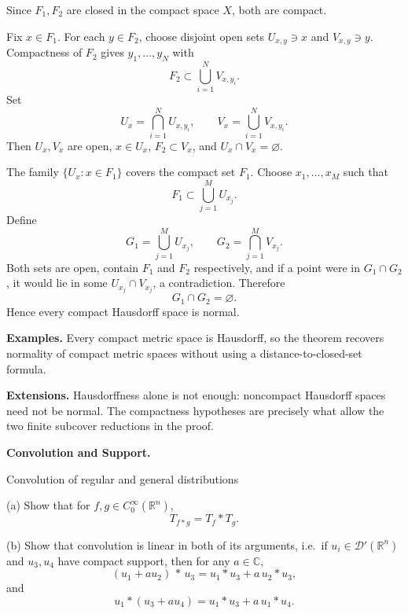 \begin{solution}
Since \(F_1,F_2\) are closed in the compact space \(X\), both are compact.

Fix \(x\in F_1\). For each \(y\in F_2\), choose disjoint open sets
\(U_{x,y}\ni x\) and \(V_{x,y}\ni y\). Compactness of \(F_2\) gives
\(y_1,\dots,y_N\) with
\[
F_2\subset\bigcup_{i=1}^N V_{x,y_i}.
\]
Set
\[
U_x=\bigcap_{i=1}^N U_{x,y_i},
\qquad
V_x=\bigcup_{i=1}^N V_{x,y_i}.
\]
Then \(U_x,V_x\) are open, \(x\in U_x\), \(F_2\subset V_x\), and
\(U_x\cap V_x=\varnothing\).

The family \(\{U_x:x\in F_1\}\) covers the compact set \(F_1\). Choose
\(x_1,\dots,x_M\) such that
\[
F_1\subset\bigcup_{j=1}^M U_{x_j}.
\]
Define
\[
G_1=\bigcup_{j=1}^M U_{x_j},
\qquad
G_2=\bigcap_{j=1}^M V_{x_j}.
\]
Both sets are open, contain \(F_1\) and \(F_2\) respectively, and if a point
were in \(G_1\cap G_2\), it would lie in some \(U_{x_j}\cap V_{x_j}\), a
contradiction. Therefore
\[
\boxed{G_1\cap G_2=\varnothing.}
\]
Hence every compact Hausdorff space is normal.

\medskip
\noindent\textbf{Examples.}
Every compact metric space is Hausdorff, so the theorem recovers normality of
compact metric spaces without using a distance-to-closed-set formula.

\medskip
\noindent\textbf{Extensions.}
Hausdorffness alone is not enough: noncompact Hausdorff spaces need not be
normal. The compactness hypotheses are precisely what allow the two finite
subcover reductions in the proof.
\end{solution}

\begin{problem}[CP-II-0257]
\label{prob:cp-ii-0257}
\textbf{Convolution and Support.}

\hspace*{1.5em}Convolution of regular and general distributions

\noindent
(a)\; Show that for $f,g\in C_0^\infty(\mathbb{R}^n)$,
\[
T_{f*g} = T_f * T_g .
\]

\medskip
\noindent
(b)\; Show that convolution is linear in both of its arguments, i.e.\ if
$u_i\in\mathcal{D}'(\mathbb{R}^n)$ and $u_3,u_4$ have compact support, then
for any $a\in\mathbb{C}$,
\[
(u_1 + a u_2)\,*\,u_3 = u_1*u_3 + a\,u_2*u_3,
\]
and
\[
u_1 * (u_3 + a u_4) = u_1*u_3 + a\,u_1*u_4.
\]
\end{problem}

